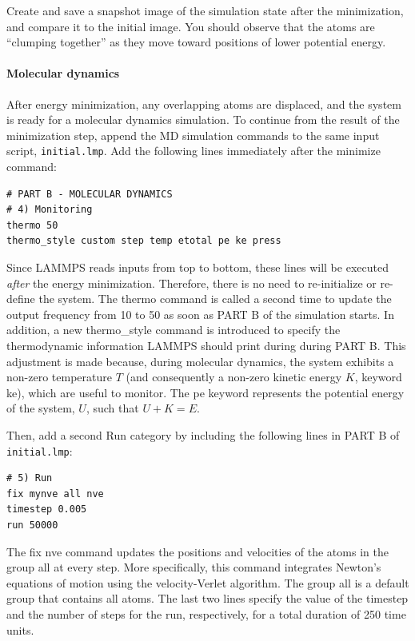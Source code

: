 \documentclass[9pt,tutorial]{livecoms}
\newcommand{\lmpcmd}[1]{\colorbox{listing}{\textcolor{command}{\small{#1}}}} %
\newcommand{\flecmd}[1]{\textcolor{command}{\texttt{#1}}} %
\begin{document}
Create and save a snapshot image of the simulation state after the
minimization, and compare it to the initial image.  You should observe
that the atoms are ``clumping together'' as they move toward positions
of lower potential energy.

\paragraph{Molecular dynamics}

After energy minimization, any overlapping atoms are displaced, and
the system is ready for a molecular dynamics simulation.  To continue
from the result of the minimization step, append the MD simulation
commands to the same input script, \flecmd{initial.lmp}.  Add the
following lines immediately after the \lmpcmd{minimize} command:
\begin{lstlisting}
# PART B - MOLECULAR DYNAMICS
# 4) Monitoring
thermo 50
thermo_style custom step temp etotal pe ke press
\end{lstlisting}

Since LAMMPS reads inputs from top to bottom, these lines will be
executed \emph{after} the energy minimization.  Therefore, there is no
need to re-initialize or re-define the system.  The \lmpcmd{thermo}
command is called a second time to update the output frequency from 10
to 50 as soon as \lmpcmd{PART B} of the simulation starts.  In addition,
a new \lmpcmd{thermo\_style} command is introduced to specify the
thermodynamic information LAMMPS should print during during \lmpcmd{PART
  B}.  This adjustment is made because, during molecular dynamics, the
system exhibits a non-zero temperature $T$ (and consequently a non-zero
kinetic energy $K$, keyword \lmpcmd{ke}), which are useful to monitor.
The \lmpcmd{pe} keyword represents the potential energy of the system,
$U$, such that $U + K = E$.

Then, add a second \lmpcmd{Run} category by including the following
lines in \lmpcmd{PART B} of \flecmd{initial.lmp}:
\begin{lstlisting}
# 5) Run
fix mynve all nve
timestep 0.005
run 50000
\end{lstlisting}
The \lmpcmd{fix nve} command updates the positions and velocities of the
atoms in the group \lmpcmd{all} at every step.  {\color{blue}More
  specifically, this command integrates Newton's equations of motion
  using the velocity-Verlet algorithm.}  The group \lmpcmd{all} is a
default group that contains all atoms.  The last two lines specify the
value of the \lmpcmd{timestep} and the number of steps for the
\lmpcmd{run}, respectively, for a total duration of 250 time units.
\end{document}
